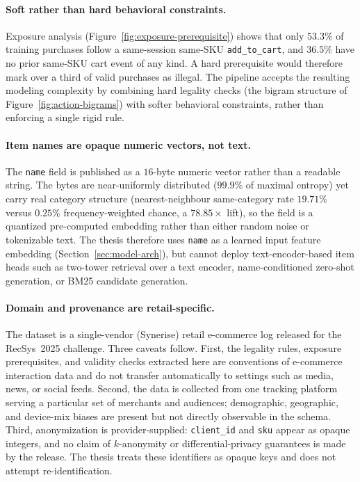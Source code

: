 \documentclass[sigconf,nonacm]{acmart}
\begin{document}
\paragraph{Soft rather than hard behavioral constraints.}
Exposure analysis (Figure~\ref{fig:exposure-prerequisite}) shows that only
$53.3\%$ of training purchases follow a same-session same-SKU
\texttt{add\_to\_cart}, and $36.5\%$ have no prior same-SKU cart event of any
kind. A hard prerequisite would therefore mark over a third of valid purchases
as illegal. The pipeline accepts the resulting modeling complexity by combining
hard legality checks (the bigram structure of Figure~\ref{fig:action-bigrams})
with softer behavioral constraints, rather than enforcing a single rigid rule.

\paragraph{Item names are opaque numeric vectors, not text.}
The \texttt{name} field is published as a $16$-byte numeric vector
rather than a readable string. The bytes are near-uniformly
distributed ($99.9\%$ of maximal entropy) yet carry real category
structure (nearest-neighbour same-category rate $19.71\%$ versus
$0.25\%$ frequency-weighted chance, a $78.85\times$ lift), so the
field is a quantized pre-computed embedding rather than
either random noise or tokenizable text. The thesis therefore uses
\texttt{name} as a learned input feature embedding
(Section~\ref{sec:model-arch}), but cannot deploy text-encoder-based
item heads such as two-tower retrieval over a text encoder,
name-conditioned zero-shot generation, or BM25 candidate generation.

\paragraph{Domain and provenance are retail-specific.}
The dataset is a single-vendor (Synerise) retail e-commerce log released for
the RecSys~2025 challenge. Three caveats follow. First, the legality rules,
exposure prerequisites, and validity checks extracted here are conventions of
e-commerce interaction data and do not transfer automatically to settings such
as media, news, or social feeds. Second, the data is collected from one tracking
platform serving a particular set of merchants and audiences; demographic,
geographic, and device-mix biases are present but not directly observable in
the schema. Third, anonymization is provider-supplied: \texttt{client\_id} and
\texttt{sku} appear as opaque integers, and no claim of $k$-anonymity or
differential-privacy guarantees is made by the release. The thesis treats these
identifiers as opaque keys and does not attempt re-identification.
\end{document}
